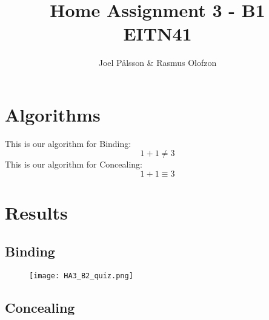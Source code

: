 \documentclass[a4paper]{article}
\title{Home Assignment 3 - B1 \\ EITN41}
\author{Joel Pålsson \& Rasmus Olofzon}
\begin{document}
    \maketitle

    \section{Algorithms}

        This is our algorithm for Binding:
        \begin{displaymath}
            1 + 1 \neq 3
        \end{displaymath}
        This is our algorithm for Concealing:
        \begin{displaymath}
            1 + 1 \equiv 3
        \end{displaymath}
    \section{Results}
    \subsection{Binding}
        \begin{figure}[h] 
            \centering
            \texttt{[image: HA3\_B2\_quiz.png]}
        \end{figure}
    \subsection{Concealing}
        \begin{figure}[h] 
            \centering
        \end{figure}
\end{document}
